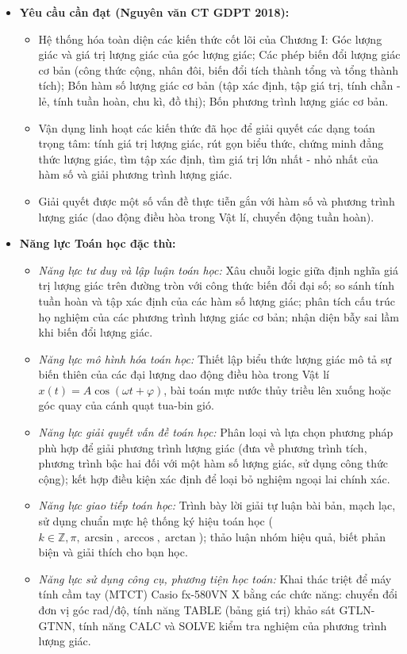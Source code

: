\documentclass[12pt, a4paper]{article}
\begin{document}
\begin{itemize}[leftmargin=1.2cm]  
    \item \textbf{Yêu cầu cần đạt (Nguyên văn CT GDPT 2018):}  
    \begin{itemize}[leftmargin=0.6cm]  
        \item Hệ thống hóa toàn diện các kiến thức cốt lõi của Chương I: Góc lượng giác và giá trị lượng giác của góc lượng giác; Các phép biến đổi lượng giác cơ bản (công thức cộng, nhân đôi, biến đổi tích thành tổng và tổng thành tích); Bốn hàm số lượng giác cơ bản (tập xác định, tập giá trị, tính chẵn - lẻ, tính tuần hoàn, chu kì, đồ thị); Bốn phương trình lượng giác cơ bản.  
        \item Vận dụng linh hoạt các kiến thức đã học để giải quyết các dạng toán trọng tâm: tính giá trị lượng giác, rút gọn biểu thức, chứng minh đẳng thức lượng giác, tìm tập xác định, tìm giá trị lớn nhất - nhỏ nhất của hàm số và giải phương trình lượng giác.  
        \item Giải quyết được một số vấn đề thực tiễn gắn với hàm số và phương trình lượng giác (dao động điều hòa trong Vật lí, chuyển động tuần hoàn).  
    \end{itemize}  
  
    \item \textbf{Năng lực Toán học đặc thù:}  
    \begin{itemize}[leftmargin=0.6cm]  
        \item \textit{Năng lực tư duy và lập luận toán học:} Xâu chuỗi logic giữa định nghĩa giá trị lượng giác trên đường tròn với công thức biến đổi đại số; so sánh tính tuần hoàn và tập xác định của các hàm số lượng giác; phân tích cấu trúc họ nghiệm của các phương trình lượng giác cơ bản; nhận diện bẫy sai lầm khi biến đổi lượng giác.  
        \item \textit{Năng lực mô hình hóa toán học:} Thiết lập biểu thức lượng giác mô tả sự biến thiên của các đại lượng dao động điều hòa trong Vật lí $x(t) = A\cos(\omega t + \varphi)$, bài toán mực nước thủy triều lên xuống hoặc góc quay của cánh quạt tua-bin gió.  
        \item \textit{Năng lực giải quyết vấn đề toán học:} Phân loại và lựa chọn phương pháp phù hợp để giải phương trình lượng giác (đưa về phương trình tích, phương trình bậc hai đối với một hàm số lượng giác, sử dụng công thức cộng); kết hợp điều kiện xác định để loại bỏ nghiệm ngoại lai chính xác.  
        \item \textit{Năng lực giao tiếp toán học:} Trình bày lời giải tự luận bài bản, mạch lạc, sử dụng chuẩn mực hệ thống ký hiệu toán học ($k \in \mathbb{Z}, \pi, \arcsin, \arccos, \arctan$); thảo luận nhóm hiệu quả, biết phản biện và giải thích cho bạn học.  
        \item \textit{Năng lực sử dụng công cụ, phương tiện học toán:} Khai thác triệt để máy tính cầm tay (MTCT) Casio fx-580VN X bằng các chức năng: chuyển đổi đơn vị góc rad/độ, tính năng TABLE (bảng giá trị) khảo sát GTLN-GTNN, tính năng CALC và SOLVE kiểm tra nghiệm của phương trình lượng giác.  
    \end{itemize}  
  

\end{itemize}
\end{document}
